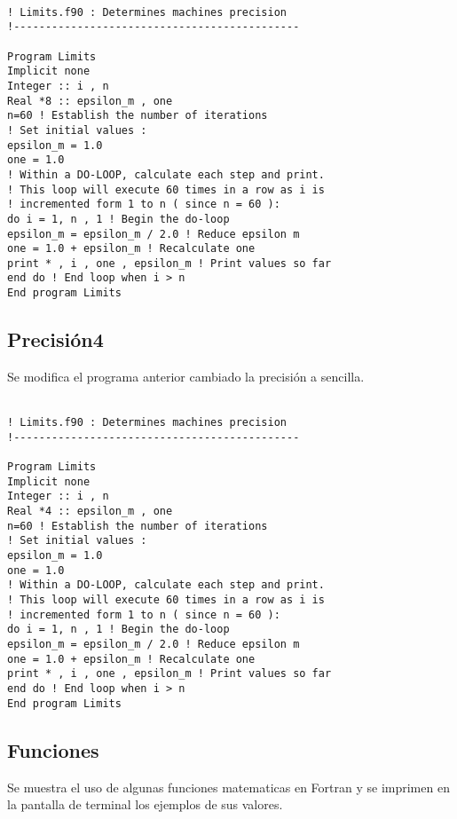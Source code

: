 \documentclass{article}
\begin{document}
\begin{Verbatim}[frame=single]

! Limits.f90 : Determines machines precision
!---------------------------------------------

Program Limits
Implicit none
Integer :: i , n
Real *8 :: epsilon_m , one
n=60 ! Establish the number of iterations
! Set initial values : 
epsilon_m = 1.0
one = 1.0
! Within a DO-LOOP, calculate each step and print.
! This loop will execute 60 times in a row as i is
! incremented form 1 to n ( since n = 60 ):
do i = 1, n , 1 ! Begin the do-loop
epsilon_m = epsilon_m / 2.0 ! Reduce epsilon m 
one = 1.0 + epsilon_m ! Recalculate one
print * , i , one , epsilon_m ! Print values so far
end do ! End loop when i > n 
End program Limits

\end{Verbatim}

\subsection*{Precisi\'on4}
Se modifica el programa anterior cambiado la precisi\'on a sencilla.\\ \\
	
		
\begin{Verbatim}[frame=single]
! Limits.f90 : Determines machines precision
!---------------------------------------------

Program Limits
Implicit none
Integer :: i , n
Real *4 :: epsilon_m , one
n=60 ! Establish the number of iterations
! Set initial values : 
epsilon_m = 1.0
one = 1.0
! Within a DO-LOOP, calculate each step and print.
! This loop will execute 60 times in a row as i is
! incremented form 1 to n ( since n = 60 ):
do i = 1, n , 1 ! Begin the do-loop
epsilon_m = epsilon_m / 2.0 ! Reduce epsilon m 
one = 1.0 + epsilon_m ! Recalculate one
print * , i , one , epsilon_m ! Print values so far
end do ! End loop when i > n 
End program Limits

\end{Verbatim}


\subsection*{Funciones}
Se muestra el uso de algunas funciones matematicas en Fortran y se imprimen en la pantalla de terminal los ejemplos de sus valores.\\ \\
\end{document}
